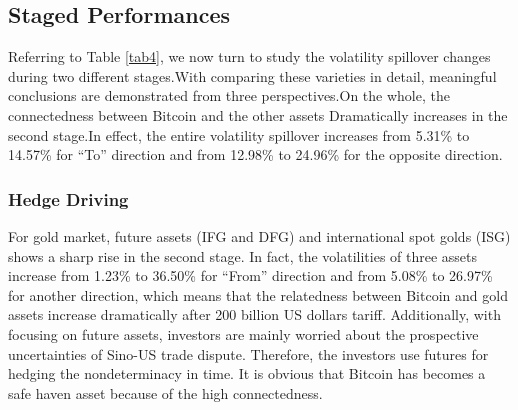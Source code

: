 \documentclass[review]{elsarticle}
\begin{document}
\subsection{Staged Performances}
Referring to Table \ref{tab4}, we now turn to study the volatility spillover changes during two different stages.With comparing these varieties in detail, meaningful conclusions are demonstrated from three perspectives.On the whole, the connectedness between Bitcoin and the other assets Dramatically increases in the second stage.In effect, the entire volatility spillover increases from 5.31\% to 14.57\% for ``To'' direction and from 12.98\% to 24.96\% for the opposite direction.

\subsubsection{Hedge Driving}
For gold market, future assets (IFG and DFG) and international spot golds (ISG) shows a sharp rise in the second stage. In fact, the volatilities of three assets increase from 1.23\% to 36.50\% for ``From'' direction and from 5.08\% to 26.97\% for another direction, which means that the relatedness between Bitcoin and gold assets increase dramatically after 200 billion US dollars tariff. Additionally, with focusing on future assets, investors are mainly worried about the prospective uncertainties of Sino-US trade dispute. Therefore, the investors use futures for hedging the nondeterminacy in time. It is obvious that Bitcoin has becomes a safe haven asset because of the high connectedness.
\end{document}
